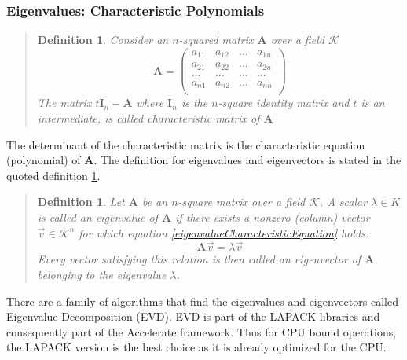\documentclass[12pt ]{article}
\newtheorem{adef}[thm]{Definition}
\begin{document}
\subsubsection{Eigenvalues: Characteristic Polynomials}
\begin{quote}
	\begin{adef}
		Consider an $n$-squared matrix $\mathbf{A}$ over a field $\mathcal{K}$
		\begin{equation*}
			\mathbf{A} = 
\left(
\begin{array}{cccc}
a_{11}  &a_{12}  & ... &a_{1n}     \\
a_{21}  &a_{22}  & ... &a_{2n}     \\
...& ...& ...&... \\
a_{n1}  &a_{n2}  & ... &a_{nn}     \\
\end{array}
\right)
		\end{equation*}
		The matrix $t\mathbf{I}_n - \mathbf{A}$ where $\mathbf{I}_n$ is the $n$-square identity matrix and $t$ is an intermediate, is called characteristic matrix of $\mathbf{A}$
	\end{adef}
	\cite[281]{schaums-linear-algebra}
\end{quote}
The determinant of the characteristic matrix is the characteristic equation (polynomial) of $\mathbf{A}$.  The definition for eigenvalues and eigenvectors is stated in the quoted definition \ref{eigenvalueDefinition}.
\begin{quote}
\begin{adef}
	\label{eigenvalueDefinition}
Let $\mathbf{A}$ be an $n$-square matrix over a field $\mathcal{K}$.  A scalar $\lambda \in K$ is called an eigenvalue of $\mathbf{A}$ if there exists a nonzero (column) vector $\vec{v}\in \mathcal{K}^n$ for which equation \ref{eigenvalueCharacteristicEquation} holds.
\begin{equation}
\mathbf{A}\vec{v} = \lambda \vec{v}  \label{eigenvalueCharacteristicEquation}
\end{equation}
Every vector satisfying this relation is then called an eigenvector of $\mathbf{A}$ belonging to the eigenvalue $\lambda$.
\end{adef}
\cite[284]{schaums-linear-algebra}
\end{quote}
There are a family of algorithms that find the eigenvalues and eigenvectors called Eigenvalue Decomposition (EVD).   EVD is part of the LAPACK libraries and consequently part of the Accelerate framework.  Thus for CPU bound operations, the LAPACK version is the best choice as it is already optimized for the CPU.    %
\end{document}
